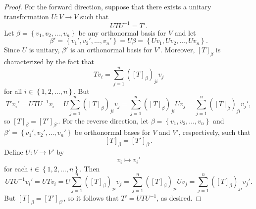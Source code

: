\documentclass[linearalgebraII]{subfiles}
\begin{document}
    \begin{proof}
        For the forward direction, suppose that there exists a unitary transformation $U:V\to V$ such that
        \begin{equation*}
            UTU^{-1} = T'.
        \end{equation*}
        Let $\beta = \left\lbrace v_1,v_2,\ldots,v_n \right\rbrace$ be any orthonormal basis for $V$ and let
        \begin{equation*}
            \beta' = \left\lbrace v_1', v_2', \ldots, v_n' \right\rbrace = U\beta = \left\lbrace Uv_1, Uv_2, \ldots, Uv_n \right\rbrace .
        \end{equation*}
        Since $U$ is unitary, $\beta'$ is an orthonormal basis for $V'$. Moreover, $\left[ T \right] _\beta$ is characterized by the fact that
        \begin{equation*}
            Tv_i = \sum^{n}_{j=1} \left( \left[ T \right] _\beta \right) _{ji}v_j
        \end{equation*}
        for all $i\in\left\lbrace 1,2,\ldots,n \right\rbrace$. But
        \begin{equation*}
            T'v_i' = UTU^{-1} v_i = U\sum^{n}_{j=1} \left( \left[ T \right] _\beta \right) _{ji}v_j = \sum^{n}_{j=1} \left( \left[ T \right] _\beta \right)_{ji}Uv_j = \sum^{n}_{j=1} \left( \left[ T \right] _\beta \right) _{ji}v_j' ,
        \end{equation*}
        so $\left[ T \right] _\beta = \left[ T' \right] _{\beta'}$. For the reverse direction, let $\beta=\left\lbrace v_1,v_2,\ldots,v_n \right\rbrace$ and $\beta' = \left\lbrace v_1',v_2',\ldots,v_n' \right\rbrace$ be orthonormal bases for $V$ and $V'$, respectively, such that
        \begin{equation*}
            \left[ T \right] _\beta = \left[ T' \right] _{\beta'}.
        \end{equation*}
        Define $U:V\to V'$ by
        \begin{equation*}
            v_i\mapsto v_i'
        \end{equation*}
        for each $i\in\left\lbrace 1,2,\ldots,n \right\rbrace$. Then
        \begin{equation*}
            UTU^{-1} v_i' = UTv_i = U\sum^{n}_{j=1} \left( \left[ T \right] _\beta \right) _{ji}v_j = \sum^{n}_{j=1} \left( \left[ T \right] _\beta \right) _{ji}Uv_j = \sum^{n}_{j=1} \left( \left[ T \right] _\beta \right) _{ji}v_j'.
        \end{equation*}
        But $\left[ T \right] _\beta = \left[ T' \right] _{\beta'}$, so it follows that $T'=UTU^{-1}$, as desired.
    \end{proof}
\end{document}
